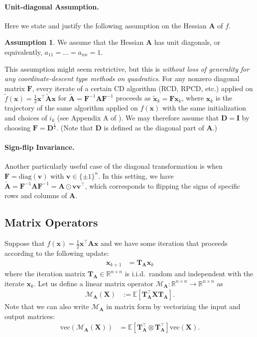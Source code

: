 \documentclass{article}
\theoremstyle{plain}
\theoremstyle{definition}
\newtheorem{assumption}[theorem]{Assumption}
\theoremstyle{remark}
\def\bigclosed#1{\left[#1\right]}
\def\vv{{\bm{v}}}
\def\vx{{\bm{x}}}
\def\mA{{\bm{A}}}
\def\mD{{\bm{D}}}
\def\mF{{\bm{F}}}
\def\mI{{\bm{I}}}
\def\mT{{\bm{T}}}
\def\mX{{\bm{X}}}
\def\gM{{\mathcal{M}}}
\newcommand{\E}{\mathbb{E}}
\newcommand{\R}{\mathbb{R}}
\begin{document}
\paragraph{Unit-diagonal Assumption.} 
Here we state and justify the following assumption on the Hessian $\mA$ of $f$.

\begin{assumption}
    \label{ass:unitdiag}
    We assume that the Hessian $\mA$ has unit diagonals, or equivalently, $a_{11} = \dots = a_{nn} = 1$.
\end{assumption}

This assumption might seem restrictive, but this is \emph{without loss of generality for any coordinate-descent type methods on quadratics}.
For any nonzero diagonal matrix $\mF$, every iterate of a certain CD algorithm (RCD, RPCD, etc.) applied on $\tilde{f}(\vx) = \frac{1}{2} \vx^{\top} \widetilde{\mA} \vx$ for $\widetilde{\mA} = \mF^{-1} \mA \mF^{-1}$ proceeds as $\tilde{\vx}_{k} = \mF \vx_{k}$, where $\vx_{k}$ is the trajectory of the same algorithm applied on $f(\vx)$ with the same initialization and choices of $i_k$ (see Appendix A of \citet{wright17}).
We may therefore assume that $\mD = \mI$ by choosing $\mF = \mD^{\frac12}$.
(Note that $\mD$ is defined as the diagonal part of $\mA$.)

\paragraph{Sign-flip Invariance.}
Another particularly useful case of the diagonal transformation is when $\mF = \mathrm{diag}(\vv)$ with $\vv \in \{\pm 1\}^n$. In this setting, we have $\widetilde{\mA} = \mF^{-1} \mA \mF^{-1} = \mA \odot \vv\vv^\top$, which corresponds to flipping the signs of specific rows and columns of $\mA$.

\subsection{Matrix Operators}

Suppose that $f(\vx) = \frac{1}{2} \vx^{\top} \mA \vx$ and we have some iteration that proceeds according to the following update:
\begin{align*}
    \vx_{k+1} &= \mT_{\mA} \vx_{k}
\end{align*}
where the iteration matrix $\mT_{\mA} \in \R^{n \times n}$ is i.i.d.\ random and independent with the iterate $\vx_{k}$.
Let us define a linear matrix operator $\gM_{\mA} : \R^{n \times n} \rightarrow \R^{n \times n}$ as
\begin{align*}
    \gM_{\mA}(\mX) &:= \E \bigclosed{\mT_{\mA}^{\top} \mX \mT_{\mA}}.
\end{align*}
Note that we can also write $\gM_{\mA}$ in matrix form by vectorizing the input and output matrices:
\begin{align*}
    \mathrm{vec} (\gM_{\mA}(\mX)) &= \E \bigclosed{\mT_{\mA}^{\top} \otimes \mT_{\mA}^{\top}} \mathrm{vec} (\mX).
\end{align*}
\end{document}
